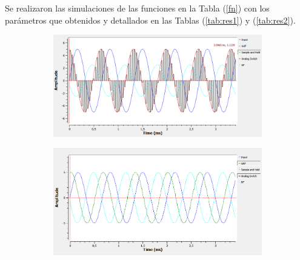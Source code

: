 Se realizaron las simulaciones de las funciones en la Tabla (\ref{fn}) con los parámetros que obtenidos y detallados en las Tablas (\ref{tab:res1}) y (\ref{tab:res2}).

\begin{figure}[H]
	\begin{subfigure}{.5\textwidth}
	\centering
	\includegraphics[width=\textwidth]{SimulacionesGNURADIO/Condiciones_optimas/COSENO_TIEMPO_LLAVE_BC.PNG}
	\end{subfigure}	
	\begin{subfigure}{.5\textwidth}
	\centering
	\includegraphics[width=\textwidth]{SimulacionesGNURADIO/Condiciones_optimas/COSENO_TIEMPO_SAMPLE_AND_HOLD_BC.PNG}
	\end{subfigure}
	

\end{figure}
